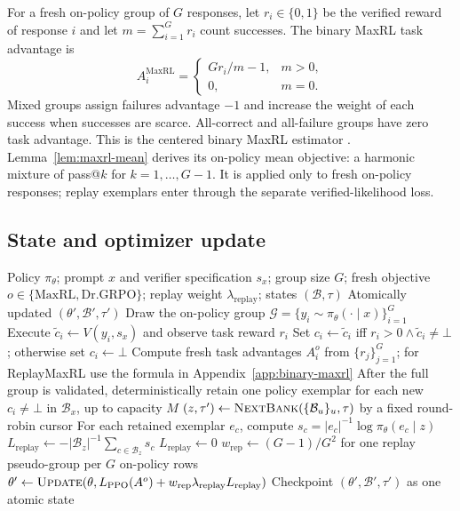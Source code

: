 For a fresh on-policy group of $G$ responses, let $r_i\in\{0,1\}$ be the
verified reward of response $i$ and let $m=\sum_{i=1}^G r_i$ count successes.
The binary MaxRL task advantage is
\[
  A_i^{\mathrm{MaxRL}}=
  \begin{cases}
    G r_i/m-1, & m>0,\\
    0, & m=0.
  \end{cases}
\]
Mixed groups assign failures advantage $-1$ and increase the weight of each
success when successes are scarce. All-correct and all-failure groups have
zero task advantage. This is the centered binary MaxRL estimator
\citep{tajwar2026maxrl}. Lemma~\ref{lem:maxrl-mean} derives its on-policy
mean objective: a harmonic mixture of pass@\(k\) for $k=1,\ldots,G-1$.
It is applied only to fresh on-policy responses;
replay exemplars enter through the separate verified-likelihood loss.

\subsection{State and optimizer update}
\label{app:algorithm-update}

\begin{algorithm}[H]
  \caption{One ReplayMaxRL optimizer update}
  \label{alg:verified-replay-update}
  \small
  \begin{algorithmic}[1]
    \REQUIRE Policy $\pi_\theta$; prompt $x$ and verifier specification
      $s_x$; group size $G$; fresh objective $o\in\{\mathrm{MaxRL},\mathrm{Dr.GRPO}\}$; replay weight $\lambda_{\mathrm{replay}}$;
      states $(\mathcal B,\tau)$
    \ENSURE Atomically updated $(\theta',\mathcal B',\tau')$
    \STATE Draw the on-policy group
      $\mathcal G=\{y_i\sim\pi_\theta(\cdot\mid x)\}_{i=1}^G$
      \STATE Execute $\widetilde c_i\gets V(y_i,s_x)$ and observe task
        reward $r_i$
      \STATE Set $c_i\gets\widetilde c_i$ iff
        $r_i>0\wedge\widetilde c_i\ne\bot$; otherwise set $c_i\gets\bot$
    \ENDFOR
    \STATE Compute fresh task advantages $A_i^{o}$ from $\{r_j\}_{j=1}^G$; for ReplayMaxRL use the formula in Appendix~\ref{app:binary-maxrl}
    \STATE After the full group is validated, deterministically retain one
      policy exemplar for each new $c_i\ne\bot$ in $\mathcal B_x$, up to
      capacity $M$
    \STATE $(z,\tau')\gets\textsc{NextBank}
      (\{\mathcal B_u\}_u,\tau)$ by a fixed round-robin cursor
      \STATE For each retained exemplar $e_c$, compute
        $s_c=|e_c|^{-1}\log\pi_\theta(e_c\mid z)$
      \STATE $L_{\mathrm{replay}}\gets-|\mathcal B_z|^{-1}
        \sum_{c\in\mathcal B_z}s_c$
    \ELSE
      \STATE $L_{\mathrm{replay}}\gets0$
    \ENDIF
    \STATE $w_{\mathrm{rep}}\gets(G-1)/G^2$ for one replay
      pseudo-group per $G$ on-policy rows
    \STATE $\theta'\gets\textsc{Update}
      (\theta,L_{\mathrm{PPO}}(A^{o})
      +w_{\mathrm{rep}}\lambda_{\mathrm{replay}}L_{\mathrm{replay}})$
    \STATE Checkpoint $(\theta',\mathcal B',\tau')$ as one atomic state
\end{algorithmic}
\end{algorithm}

